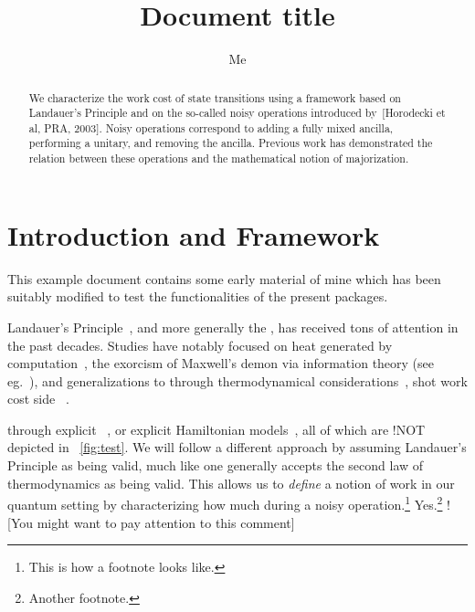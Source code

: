 \documentclass[10pt,a4paper,aps,reprint,notitlepage,nofootinbib]{revtex4-1}
\begin{document}
\title{Document title}
\author{Me}
\begin{abstract}
  We characterize the work cost of state transitions using a framework based on
  Landauer's Principle and on the so-called noisy operations introduced
  by~[Horodecki et al, PRA, 2003]. Noisy operations correspond to adding a fully
  mixed ancilla, performing a unitary, and removing the ancilla. Previous work
  has demonstrated the relation between these operations and the mathematical
  notion of majorization.
\end{abstract}
\maketitle

\section{Introduction and Framework}

This example document contains some early material of mine which has been
suitably modified to test the functionalities of the present packages.

Landauer's Principle~\cite{Landauer1961_5392446Erasure}, and more generally the
,
 \jd has received tons of attention \endjd in the
past decades.  Studies have notably focused on heat generated by
computation~\cite{Bennett1982IJTP_ThermodynOfComp}, the exorcism of Maxwell's
demon via information theory (see eg.~\cite{Bennett2003_NotesLP}), and
generalizations to  through thermodynamical
considerations~\cite{Oppenheim2002PRL_thermodynamical},  shot work cost    side
~\cite{delRio2011Nature}.

 through explicit ~\cite{Szilard1929ZeitschriftFuerPhysik,Dahlsten2011NJP_inadequacy}, or
explicit Hamiltonian models~\cite{Alicki2004_hamiltonian}, all of which are
\ccfour!{NOT}
depicted in \figurename~\ref{fig:test}. We will follow a different approach by
assuming Landauer's Principle as being valid, much like one generally accepts
the second law of thermodynamics as being valid. This allows us to {\em define}
a notion of work in our quantum setting by characterizing how much
 during a noisy
operation.\footnote{This is how a footnote looks like.} Yes.\footnote{Another
  footnote.} \ccsix![You might want to pay attention to this comment]
\end{document}

